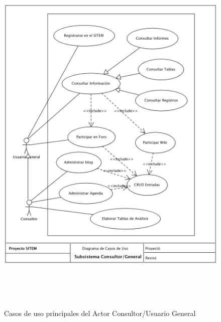 \begin{figure}
 \centering
 \includegraphics[width=156mm, height=182mm]{casos_consultor.png}
 \caption{Casos de uso principales del Actor Consultor/Usuario General}
 \label{casos_consultor}
\end{figure}

